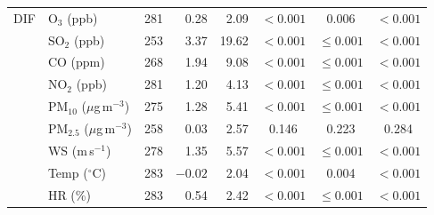 \begin{longtable}{@{}llrrrccc@{}}
\midrule
DIF       & O$_3$ (ppb)                      & 281 & 0.28 & 2.09  & $<0.001$ & 0.006       & $<0.001$ \\
          & SO$_2$ (ppb)                     & 253 & 3.37 & 19.62 & $<0.001$ & $\leq0.001$ & $<0.001$ \\
          & CO (ppm)                         & 268 & 1.94 & 9.08  & $<0.001$ & $\leq0.001$ & $<0.001$ \\
          & NO$_2$ (ppb)                     & 281 & 1.20 & 4.13  & $<0.001$ & $\leq0.001$ & $<0.001$ \\
          & PM$_{10}$ ($\mu$g\,m$^{-3}$)     & 275 & 1.28 & 5.41  & $<0.001$ & $\leq0.001$ & $<0.001$ \\
          & PM$_{2.5}$ ($\mu$g\,m$^{-3}$)    & 258 & 0.03 & 2.57  & 0.146    & 0.223       & 0.284 \\
          & WS (m\,s$^{-1}$)                 & 278 & 1.35 & 5.57  & $<0.001$ & $\leq0.001$ & $<0.001$ \\
          & Temp ($^{\circ}$C)               & 283 & $-0.02$ & 2.04 & $<0.001$ & 0.004      & $<0.001$ \\
          & HR (\%)                          & 283 & 0.54 & 2.42  & $<0.001$ & $\leq0.001$ & $<0.001$ \\
\end{longtable}

